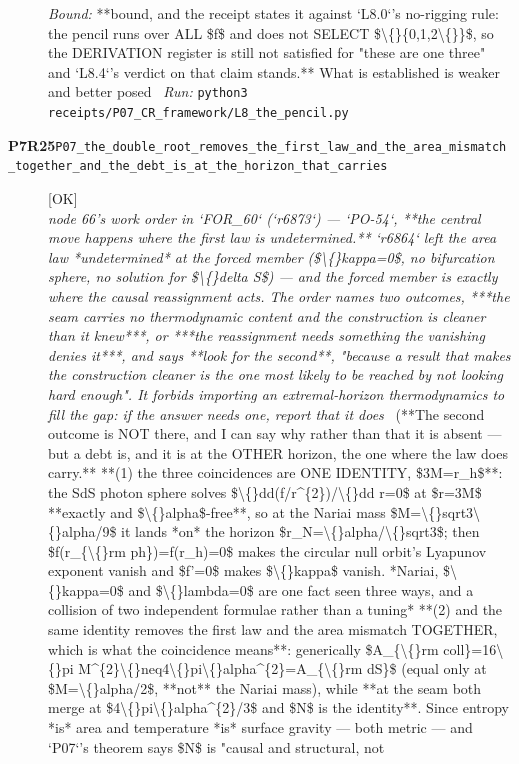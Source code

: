 \begin{description}
 \emph{Bound:} **bound, and the receipt states it against `L8.0`'s no-rigging rule: the pencil runs over ALL \$f\$ and does not SELECT \$\textbackslash\{\}\{0,1,2\textbackslash\{\}\}\$, so the DERIVATION register is still not satisfied for "these are one three" and `L8.4`'s verdict on that claim stands.** What is established is weaker and better posed
\ \emph{Run:} \texttt{python3 receipts/P07\_CR\_framework/L8\_the\_pencil.py}
\item[\rcptlabel{P07_the_double_root_removes_the_first_law_and_the_area_mismatch_together_and_the_debt_is_at_the_horizon_that_carries}{P7R25}\textbf{P7R25}\quad\texttt{P07\_the\_double\_root\_removes\_the\_first\_law\_and\_the\_area\_mismatch\_together\_and\_the\_debt\_is\_at\_the\_horizon\_that\_carries}]\hfill\textsf{[OK]}\\
\textit{node 66's work order in `FOR\_60` (`r6873`) --- `PO-54`, **the central move happens where the first law is undetermined.** `r6864` left the area law *undetermined* at the forced member (\$\textbackslash\{\}kappa=0\$, no bifurcation sphere, no solution for \$\textbackslash\{\}delta S\$) --- and the forced member is exactly where the causal reassignment acts. The order names two outcomes, ***the seam carries no thermodynamic content and the construction is cleaner than it knew***, or ***the reassignment needs something the vanishing denies it***, and says **look for the second**, "because a result that makes the construction cleaner is the one most likely to be reached by not looking hard enough". It forbids importing an extremal-horizon thermodynamics to fill the gap: if the answer needs one, report that it does} \ (**The second outcome is NOT there, and I can say why rather than that it is absent --- but a debt is, and it is at the OTHER horizon, the one where the law does carry.**  **(1) the three coincidences are ONE IDENTITY, \$3M=r\_h\$**: the SdS photon sphere solves \$\textbackslash\{\}dd(f/r\textasciicircum{}\{2\})/\textbackslash\{\}dd r=0\$ at \$r=3M\$ **exactly and \$\textbackslash\{\}alpha\$-free**, so at the Nariai mass \$M=\textbackslash\{\}sqrt3\textbackslash\{\}alpha/9\$ it lands *on* the horizon \$r\_N=\textbackslash\{\}alpha/\textbackslash\{\}sqrt3\$; then \$f(r\_\{\textbackslash\{\}rm ph\})=f(r\_h)=0\$ makes the circular null orbit's Lyapunov exponent vanish and \$f'=0\$ makes \$\textbackslash\{\}kappa\$ vanish. *Nariai, \$\textbackslash\{\}kappa=0\$ and \$\textbackslash\{\}lambda=0\$ are one fact seen three ways, and a collision of two independent formulae rather than a tuning*  **(2) and the same identity removes the first law and the area mismatch TOGETHER, which is what the coincidence means**: generically \$A\_\{\textbackslash\{\}rm coll\}=16\textbackslash\{\}pi M\textasciicircum{}\{2\}\textbackslash\{\}neq4\textbackslash\{\}pi\textbackslash\{\}alpha\textasciicircum{}\{2\}=A\_\{\textbackslash\{\}rm dS\}\$ (equal only at \$M=\textbackslash\{\}alpha/2\$, **not** the Nariai mass), while **at the seam both merge at \$4\textbackslash\{\}pi\textbackslash\{\}alpha\textasciicircum{}\{2\}/3\$ and \$N\$ is the identity**. Since entropy *is* area and temperature *is* surface gravity --- both metric --- and `P07`'s theorem says \$N\$ is "causal and structural, not 
\end{description}
